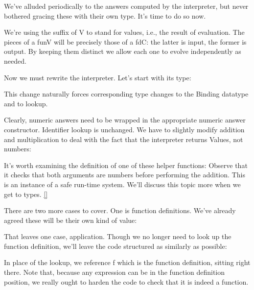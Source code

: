 We’ve alluded periodically to the answers computed by the interpreter, but never
bothered gracing these with their own type. It’s time to do so now.

We’re using the suffix of V to stand for values, i.e., the result of evaluation.
The pieces of a funV will be precisely those of a fdC: the latter is input, the
former is output. By keeping them distinct we allow each one to evolve
independently as needed.

Now we must rewrite the interpreter. Let’s start with its type:

This change naturally forces corresponding type changes to the Binding datatype
and to lookup.


Clearly, numeric answers need to be wrapped in the appropriate numeric answer
constructor. Identifier lookup is unchanged. We have to slightly modify addition
and multiplication to deal with the fact that the interpreter returns Values,
not numbers:

It’s worth examining the definition of one of these helper functions:
Observe that it checks that both arguments are numbers before performing the
addition. This is an instance of a safe run-time system. We’ll discuss this
topic more when we get to types. \ref{}

There are two more cases to cover. One is function definitions. We’ve already
agreed these will be their own kind of value:

That leaves one case, application. Though we no longer need to look up the
function definition, we’ll leave the code structured as similarly as possible:

In place of the lookup, we reference f which is the function definition, sitting
right there. Note that, because any expression can be in the function definition
position, we really ought to harden the code to check that it is indeed a
function.


